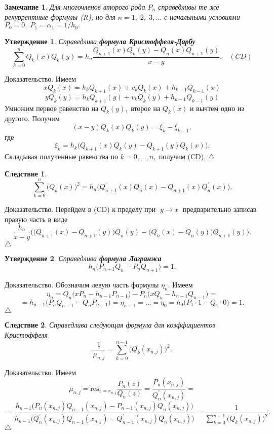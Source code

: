 \documentclass[12 pt, a4 paper]{article}
\theoremstyle{plain}   \newtheorem{Pro}{Задача}
\newtheorem{Sta}{Утверждение}
\newtheorem{Rem}{Замечание}
\newtheorem{Cor}{Следствие}
\begin{document}
\begin{Rem}
Для многочленов второго рода
$ P_n $
справедливы те же рекуррентные формулы (R), но для
$ n=1, \; 2, \; 3,... $
с начальными условиями
$ P_0 =0, \; P_1 =\alpha _1 =1/h_0 . $
\end{Rem}
\begin{Sta}
Справедлива
{\bfseries формула Кристоффеля-Дарбу}
$$
  \sum _{k=0}^n Q_k (x)Q_k (y)=h_n
  \frac{Q_{n+1}(x)Q_n (y)-Q_n (x)Q_{n+1}(y)}{x-y}.
  \quad (CD)
$$
\end{Sta}
{\Large Доказательство.}
Имеем
$$
  xQ_k (x)=h_k Q_{k+1}(x)+v_k Q_k (x)+h_{k-1}Q_{k-1}(x)
$$
$$
  yQ_k (y)=h_k Q_{k+1}(y)+v_k Q_k (y)+h_{k-1}Q_{k-1}(y)
$$
Умножим первое равенство на
$ Q_k (y) , $
второе на
$ Q_k (x) $
и вычтем одно из другого. Получим
$$
  (x-y)Q_k (x)Q_k (y)=\xi _k -\xi _{k-1} ,
$$
где
$$
  \xi _k =h_k \biggl ( Q_{k+1}(x)Q_k (y)-Q_{k+1}(y)Q_k (x) \biggr ) .
$$
Складывая полученные равенства по
$ k=0,...,n , $
получим (CD). $ \triangle $
\begin{Cor}
$$
  \sum _{k=0}^n \bigl ( Q_k (x) \bigr ) ^2 =
  h_n \biggl ( Q_{n+1}^{\prime}(x)Q_n (x)-
  Q_{n+1}(x)Q_n ^{\prime}(x) \biggr ) .
$$
\end{Cor}
{\Large Доказательство.}
Перейдем в (CD) к пределу при
$ \; y \rightarrow x \; $
предварительно записав правую часть в виде
$$
  \frac{h_n}{x-y} \Biggl ( \bigl ( Q_{n+1}(x)-Q_{n+1}(y) \bigr )
  Q_n (y) - \bigl ( Q_n (x)-Q_n(y) \bigr ) Q_{n+1}(y) \Biggr ) .
$$
$ \triangle $
\begin{Sta}
Справедлива
{\bfseries формула Лагранжа}
$$
  h_n \bigl ( P_{n+1}Q_n -P_n Q_{n+1} \bigr ) =1.
$$
\end{Sta}
{\Large Доказательство.}
Обозначим левую часть формулы
$ \eta _n . $
Имеем
$$
  \eta _n = Q_n \bigl ( xP_n -h_{n-1}P_{n-1} \bigr ) -
  P_n \bigl ( xQ_n -h_{n-1}Q_{n-1} \bigr ) =
$$
$$
  =h_{n-1} \bigl (P_n Q_{n-1}-Q_nP_{n-1} \bigr ) =
  \eta _{n-1} =...=\eta _0 =
  h_0 \bigl ( P_1 \cdot 1-Q_1 \cdot 0 \bigr ) =1.
$$
$ \triangle $
\begin{Cor}
Справедлива следующая формула для коэффициентов Кристоффеля
$$
  \frac{1}{\mu _{n,j}}=
  \sum _{k=0}^{n-1} \bigl ( Q_k (x_{n,j}) \bigr ) ^2 .
$$
\end{Cor}
{\Large Доказательство.}
Имеем
$$
 \mu _{n,j}=\mathrm{res}_{z=x_{n,j}}
 \frac{P_n (z)}{Q_n (z)}=
 \frac{P_n (x_{n,j})}{Q_n ^{\prime}(x_{n,j})}=
$$
$$
 =\frac{h_{n-1} \bigl ( P_n (x_{n,j})Q_{n-1}(x_{n,j})-
 P_{n-1}(x_{n,j})Q_n (x_{n,j}) \bigr ) }
 {h_{n-1} \bigl ( Q_n ^{\prime}(x_{n,j})Q_{n-1}(x_{n,j})-
 Q_{n-1}^{\prime}(x_{n,j})Q_n (x_{n,j}) \bigr ) } =
 \frac{1}{\sum _{k=0}^{n-1} \bigl ( Q_k (x_{n,j}) \bigr ) ^2 } .
$$
$ \triangle $
\newpage
\end{document}
